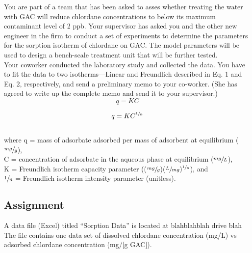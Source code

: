 \documentclass[12pt,letterpaper]{article}
\begin{document}
You are part of a team that has been asked to asses whether treating the water with GAC will reduce chlordane concentrations to below its maximum contaminant level of 2 ppb. Your supervisor has asked you and the other new engineer in the firm to conduct a set of experiments to determine the parameters for the sorption isotherm of chlordane on GAC.  The model  parameters will be used to design a bench-scale treatment unit that will be further tested.\\

Your coworker conducted the laboratory study and collected the data. You have to fit the data to two isotherms---Linear and Freundlich described in Eq. 1 and Eq. 2, respectively, and send a preliminary memo to your co-worker.  (She has agreed to write up the complete memo and send it to your supervisor.)\\

\begin{equation}
q = KC
\end{equation}


\begin{equation}
q = KC^{\sfrac{1}{n}}
\end{equation}\\

where q = mass of adsorbate adsorbed per mass of adsorbent at equilibrium ($\sfrac{mg}{g}$),\\

C = concentration of adsorbate in the aqueous phase at equilibrium ($\sfrac{mg}{L}$),\\

K = Freundlich isotherm capacity parameter (($\sfrac{mg}{g}$)($\sfrac{L}{mg})^{\sfrac{1}{n}}$), and\\

$\sfrac{1}{n}$ = Freundlich isotherm intensity parameter (unitless).\\


\subsection *{Assignment}

A data file (Excel) titled ``Sorption Data'' is located at blahblahblah drive blah
The file contains one data set of dissolved chlordane concentration (mg/L) vs adsorbed chlordane concentration (mg/[g GAC]).
\end{document}
